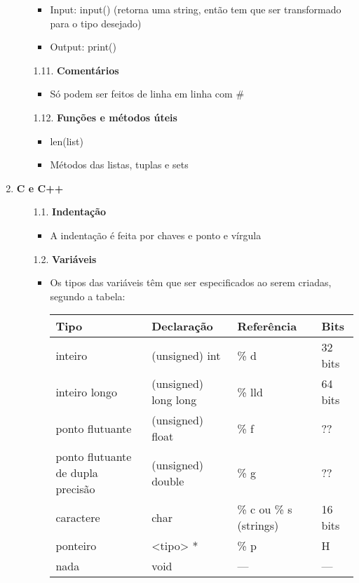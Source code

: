 \documentclass[12pt, a4paper]{article} %
\begin{document}
\begin{enumerate}
\begin{enumerate}
\begin{itemize}
\item Input: input() (retorna uma string, então tem que ser transformado para o tipo desejado)
\item Output: print()
\end{itemize}
\item[1.11.] \textbf{Comentários}
\begin{itemize}
\item Só podem ser feitos de linha em linha com $\#$
\end{itemize}
\item[1.12.] \textbf{Funções e métodos úteis}
\begin{itemize}
\item len(list)
\item Métodos das listas, tuplas e sets
\end{itemize}
\end{enumerate}
\Large
\item \textbf{C e C++}
\normalsize
\begin{enumerate}
\item[1.1.] \textbf{Indentação} 
\begin{itemize}
\item A indentação é feita por chaves e ponto e vírgula
\end{itemize}
\item[1.2.] \textbf{Variáveis} 
\begin{itemize}
\item Os tipos das variáveis têm que ser especificados ao serem criadas, segundo a tabela:
\begin{center}
\begin{tabular}{ | p{4cm} | l | l | l |} \hline 
Tipo & Declaração & Referência & Bits \\ \hline
inteiro & (unsigned) int & \% d & 32 bits \\ \hline
inteiro longo& (unsigned) long long & \% lld & 64 bits\\ \hline
ponto flutuante & (unsigned) float & \% f & ?? \\ \hline
ponto flutuante de dupla precisão & (unsigned) double & \% g & ?? \\ \hline
caractere & char & \% c ou \% s (strings) & 16 bits \\ \hline
ponteiro & <tipo> * & \% p & H \\ \hline
nada & void & --- & --- \\ \hline

\end{tabular}
\end{center}
\end{itemize}
\end{enumerate}
\end{enumerate}
\end{document}
